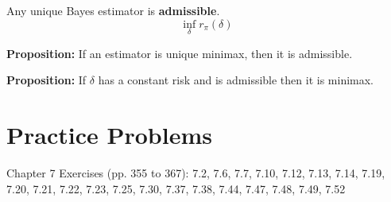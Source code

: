 \documentclass[11pt,fleqn]{book} %
\begin{document}
\begin{theorem}
	Any unique Bayes estimator is \textbf{admissible}. 
	$$\inf_\delta r_\pi(\delta)$$
\end{theorem}

\textbf{Proposition:} If an estimator is unique minimax, then it is admissible. 

\textbf{Proposition:} If $\delta$ has a constant risk and is admissible then it is minimax.

\section{Practice Problems}

Chapter 7 Exercises (pp. 355 to 367): 7.2, 7.6, 7.7, 7.10, 7.12, 7.13, 7.14, 7.19, 7.20, 7.21, 7.22, 7.23, 7.25, 7.30, 7.37, 7.38, 7.44, 7.47, 7.48, 7.49, 7.52\\
\\
\end{document}
